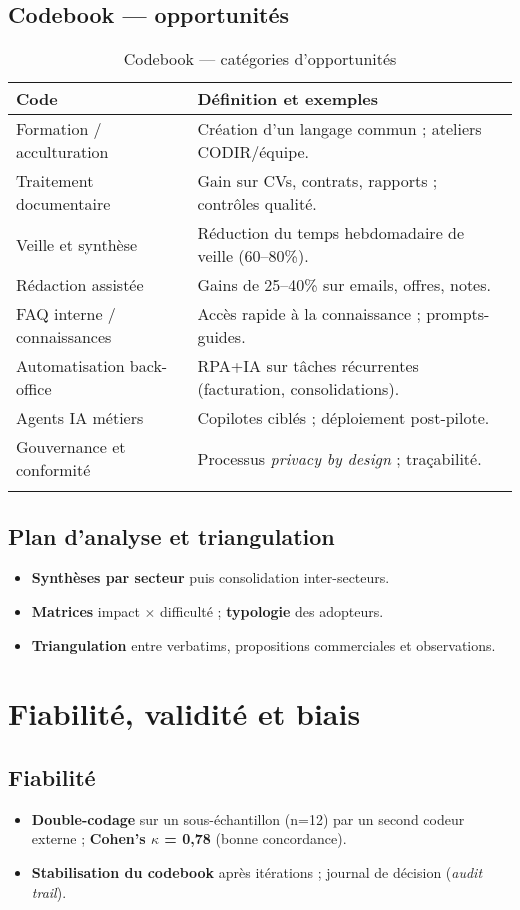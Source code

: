 \subsection{Codebook — opportunités}
\begin{longtable}{@{}p{4.5cm}p{9cm}@{}}
\toprule
\textbf{Code} & \textbf{Définition et exemples} \\
\midrule
Formation / acculturation & Création d'un langage commun ; ateliers CODIR/équipe. \\
Traitement documentaire & Gain sur CVs, contrats, rapports ; contrôles qualité. \\
Veille et synthèse & Réduction du temps hebdomadaire de veille (60–80\%). \\
Rédaction assistée & Gains de 25–40\% sur emails, offres, notes. \\
FAQ interne / connaissances & Accès rapide à la connaissance ; prompts-guides. \\
Automatisation back-office & RPA+IA sur tâches récurrentes (facturation, consolidations). \\
Agents IA métiers & Copilotes ciblés ; déploiement post-pilote. \\
Gouvernance et conformité & Processus \emph{privacy by design} ; traçabilité. \\
\bottomrule
\caption{Codebook — catégories d'opportunités}\label{tab:codes_opportunites}
\end{longtable}

\subsection{Plan d'analyse et triangulation}
\begin{itemize}
    \item \textbf{Synthèses par secteur} puis consolidation inter-secteurs.
    \item \textbf{Matrices} impact $\times$ difficulté ; \textbf{typologie} des adopteurs.
    \item \textbf{Triangulation} entre verbatims, propositions commerciales et observations.
\end{itemize}

\section{Fiabilité, validité et biais}
\subsection{Fiabilité}
\begin{itemize}
    \item \textbf{Double-codage} sur un sous-échantillon (n=12) par un second codeur externe ; \textbf{Cohen's $\kappa$ = 0,78} (bonne concordance).
    \item \textbf{Stabilisation du codebook} après itérations ; journal de décision (\emph{audit trail}).
\end{itemize}

